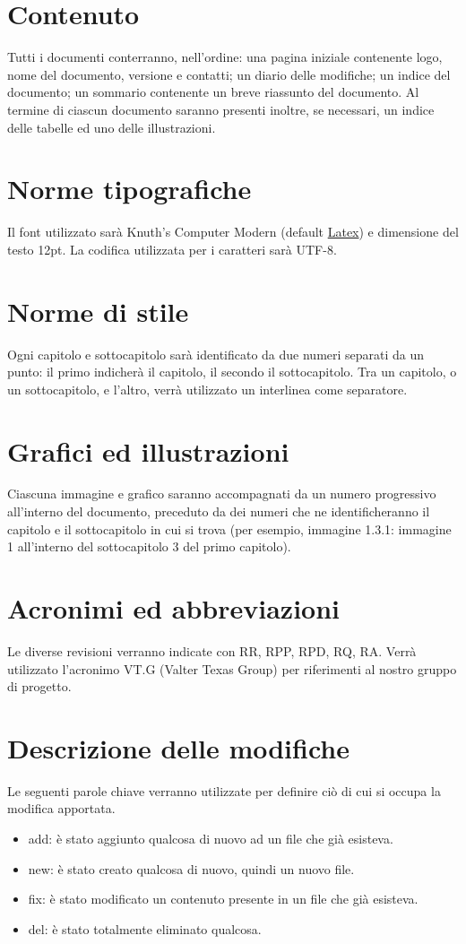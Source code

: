 \section{Contenuto}
Tutti i documenti conterranno, nell'ordine: una pagina iniziale contenente logo,
nome del documento, versione e contatti; un diario delle modifiche; un indice
del documento; un sommario contenente un breve riassunto del documento. Al
termine di ciascun documento saranno presenti inoltre, se necessari, un indice
delle tabelle ed uno delle illustrazioni.

\section{Norme tipografiche}
Il font utilizzato sar\`a Knuth's Computer Modern (default \underline{Latex}) e
dimensione del testo 12pt. La codifica utilizzata per i caratteri sar\`a UTF-8.

\section{Norme di stile}
Ogni capitolo e sottocapitolo sar\`a identificato da due numeri separati da un
punto: il primo indicher\`a il capitolo, il secondo il sottocapitolo. Tra un
capitolo, o un sottocapitolo, e l'altro, verr\`a utilizzato un interlinea come
separatore.

\section{Grafici ed illustrazioni}
Ciascuna immagine e grafico saranno accompagnati da un numero progressivo
all'interno del documento, preceduto da dei numeri che ne identificheranno il
capitolo e il sottocapitolo in cui si trova (per esempio, immagine 1.3.1:
immagine 1 all'interno del sottocapitolo 3 del primo capitolo).

\section{Acronimi ed abbreviazioni}
Le diverse revisioni verranno indicate con RR, RPP, RPD, RQ, RA. Verr\`a
utilizzato l'acronimo VT.G (Valter Texas Group) per riferimenti al nostro gruppo
di progetto.

\section{Descrizione delle modifiche}
Le seguenti parole chiave verranno utilizzate per definire ci\`o di cui si occupa
la modifica apportata.
\begin{itemize}
\item add: \`e stato aggiunto qualcosa di nuovo ad un file che gi\`a esisteva.
\item new: \`e stato creato qualcosa di nuovo, quindi un nuovo file. 
\item fix: \`e stato modificato un contenuto presente in un file che gi\`a
esisteva. 
\item del: \`e stato totalmente eliminato qualcosa.
\end{itemize}


